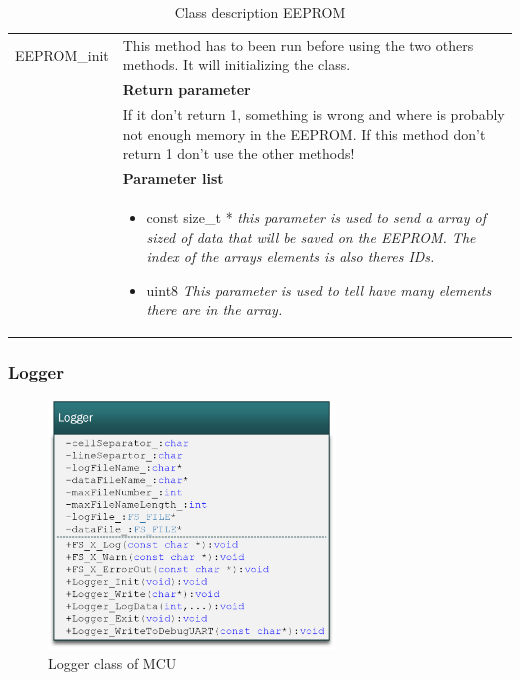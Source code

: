 \begin{table}[H]
\begin{tabular}{|p{5 cm}|p{10 cm}|}
		EEPROM\_init
		& This method has to been run before using the two others methods. It will initializing the class.
		\\ & \textbf{Return parameter}
		\\ & If it don't return 1, something is wrong and where is probably not enough memory in the EEPROM. If this method don't return 1 don't use the other methods!   
		\\ & \textbf{Parameter list}
		\\ & \begin{itemize}
			\item {\large const size\_t *}
			\subitem \textit{this parameter is used to send a array of sized of data that will be saved on the EEPROM. The index of the arrays elements is also theres IDs.}
			\item {\large uint8}
			\subitem \textit{This parameter is used to tell have many elements there are in the array.}
		\end{itemize}
		\\ \hline
		
	\end{tabular}
	\caption{Class description EEPROM}
	\label{table:Class_description_EEPROM}
\end{table}

\subsubsection{Logger}

\begin{figure}[H]
	\centering
	\includegraphics [width=3in]{Software/Pictures/class-diagram-logger.png}
	\caption{Logger class of MCU}
	\label{fig:Class_diagram_MCU_logger}
\end{figure}

